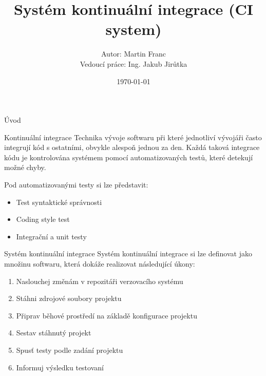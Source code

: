 \documentclass{beamer}
\title{Systém kontinuální integrace (CI system)}
\date{\today}
\author{Autor: Martin Franc \\ Vedoucí práce: Ing. Jakub Jirůtka \\}
\begin{document}



	\maketitle

	\begin{frame}{Úvod}
		\begin{block}{Kontinuální integrace}
			Technika vývoje softwaru při které jednotliví vývojáři často integrují kód s ostatními, obvykle alespoň jednou za den.
			Každá taková integrace kódu je kontrolována systémem pomocí automatizovaných testů, které detekují možné chyby.
		\end{block}
		
		Pod automatizovanými testy si lze představit:
		\begin{itemize}
			\item Test syntaktické správnosti
			\item Coding style test
			\item Integrační a unit testy
		\end{itemize}
	\end{frame}

	\begin{frame}{Systém kontinuální integrace}
		Systém kontinuální integrace si lze definovat jako množinu softwaru, která dokáže realizovat následující úkony:

		\begin{enumerate}
			\item Naslouchej změnám v repozitáři verzovacího systému
			\item Stáhni zdrojové soubory projektu
			\item Připrav běhové prostředí na základě konfigurace projektu
			\item Sestav stáhnutý projekt
			\item Spusť testy podle zadání projektu
			\item Informuj výsledku testovaní
		\end{enumerate}
	\end{frame}
\end{document}
